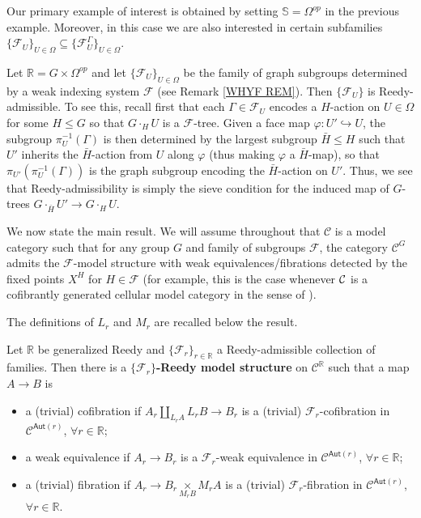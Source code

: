 \documentclass[a4paper,10pt
 ,draft
]{article}%
\begin{document}
Our primary example of interest is obtained by setting
$\mathbb{S} = \Omega^{op}$ in the previous example.
Moreover, in this case we are also interested 
in certain subfamilies
$\{\mathcal{F}_U\}_{U \in \Omega}
\subseteq
\{\mathcal{F}_U^{\Gamma}\}_{U \in \Omega}$.


\begin{example}\label{FGRAPHREEDY EX}
	Let $\mathbb{R} = G \times \Omega^{op}$ and let
	$\{\mathcal{F}_U\}_{U \in \Omega}$ be the family of graph subgroups determined by a weak indexing system $\mathcal{F}$ (see Remark \ref{WHYF REM}).
	Then $\{\mathcal{F}_U\}$ is Reedy-admissible.
	To see this, recall first that each $\Gamma \in \mathcal{F}_U$ encodes 
	a $H$-action on $U \in \Omega$ for some $H \leq G$
	so that $G \cdot_H U$ is a $\mathcal{F}$-tree.
	Given a face map $\varphi \colon U' \hookrightarrow U$, 
	the subgroup $\pi^{-1}_U(\Gamma)$ is then determined by the largest subgroup $\bar{H}\leq H$ such that 
	$U'$ inherits the $\bar{H}$-action from $U$ along $\varphi$ (thus making $\varphi$ a $\bar{H}$-map), 
	so that $\pi_{U'}(\pi^{-1}_U(\Gamma))$ is the graph subgroup encoding the $\bar{H}$-action on $U'$.
	Thus, we see that Reedy-admissibility is simply the sieve condition for the induced map of $G$-trees
	$G \cdot_{\bar{H}} U' \to G \cdot_H U$.
\end{example}


We now state the main result.
We will assume throughout that $\mathcal{C}$ is a model category such that for any group $G$ and family of subgroups $\mathcal{F}$,
the category $\mathcal{C}^G$ admits the
$\mathcal{F}$-model structure
with weak equivalences/fibrations detected by the fixed points
$X^H$ for $H \in \mathcal{F}$
(for example, this is the case whenever $\mathcal{C}$ is a cofibrantly generated cellular model category in the sense of \cite{Ste16}).

The definitions of $L_r$ and $M_r$ are recalled below the result.

\begin{theorem}\label{REEDYADM THM}
Let $\mathbb{R}$ be generalized Reedy and 
$\{\mathcal{F}_r\}_{r \in \mathbb{R}}$ a Reedy-admissible collection of families. 
Then there is a \textbf{$\{\mathcal{F}_r\}$-Reedy model structure} on
$\mathcal{C}^{\mathbb{R}}$ such that a map $A \to B$ is
\begin{itemize}
  \item a (trivial) cofibration if $A_r \underset{L_r A}{\amalg}L_r B \to B_r$ is a (trivial) $\mathcal{F}_r$-cofibration in $\mathcal{C}^{\mathsf{Aut}(r)}$, $\forall r \in \mathbb{R}$;
	\item a weak equivalence if $A_r \to B_r$ is a $\mathcal{F}_r$-weak equivalence in $\mathcal{C}^{\mathsf{Aut}(r)}$, $\forall r \in \mathbb{R}$;
	\item a (trivial) fibration if $A_r \to B_r \underset{M_r B}{\times }M_r A $ is a (trivial) $\mathcal{F}_r$-fibration in $\mathcal{C}^{\mathsf{Aut}(r)}$, $\forall r \in \mathbb{R}$.
\end{itemize}
\end{theorem}
\end{document}
